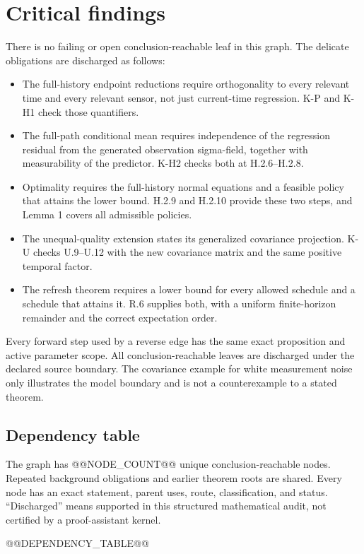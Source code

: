 \documentclass[11pt,letterpaper]{article}
\begin{document}
\section{Critical findings}
There is no failing or open conclusion-reachable leaf in this graph. The delicate obligations are discharged as follows:
\begin{itemize}
\item The full-history endpoint reductions require orthogonality to every relevant time and every relevant sensor, not just current-time regression. K-P and K-H1 check those quantifiers.
\item The full-path conditional mean requires independence of the regression residual from the generated observation sigma-field, together with measurability of the predictor. K-H2 checks both at H.2.6--H.2.8.
\item Optimality requires the full-history normal equations and a feasible policy that attains the lower bound. H.2.9 and H.2.10 provide these two steps, and Lemma 1 covers all admissible policies.
\item The unequal-quality extension states its generalized covariance projection. K-U checks U.9--U.12 with the new covariance matrix and the same positive temporal factor.
\item The refresh theorem requires a lower bound for every allowed schedule and a schedule that attains it. R.6 supplies both, with a uniform finite-horizon remainder and the correct expectation order.
\end{itemize}
Every forward step used by a reverse edge has the same exact proposition and active parameter scope. All conclusion-reachable leaves are discharged under the declared source boundary. The covariance example for white measurement noise only illustrates the model boundary and is not a counterexample to a stated theorem.

\begin{landscape}
\section{Dependency table}
The graph has @@NODE_COUNT@@ unique conclusion-reachable nodes. Repeated background obligations and earlier theorem roots are shared. Every node has an exact statement, parent uses, route, classification, and status. ``Discharged'' means supported in this structured mathematical audit, not certified by a proof-assistant kernel.

{\footnotesize @@DEPENDENCY_TABLE@@}
\end{landscape}
\end{document}
